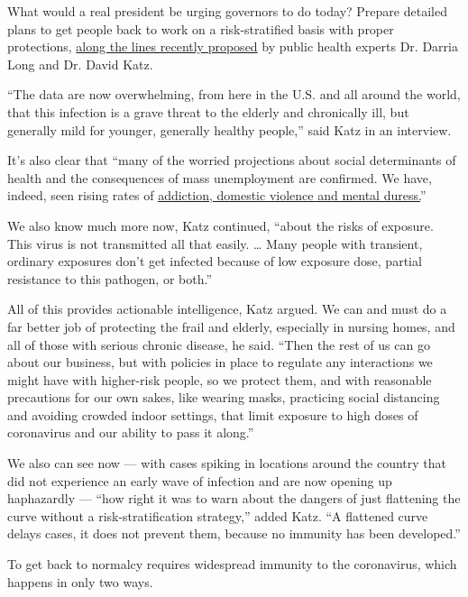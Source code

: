 What would a real president be urging governors to do today? Prepare
detailed plans to get people back to work on a risk-stratified basis
with proper protections,
\href{https://medium.com/@drdarrialonganddrdavidkatz/as-cities-move-toward-reopening-how-to-manage-risks-1834a264f9d1}{along
the lines recently proposed} by public health experts Dr. Darria Long
and Dr. David Katz.

``The data are now overwhelming, from here in the U.S. and all around
the world, that this infection is a grave threat to the elderly and
chronically ill, but generally mild for younger, generally healthy
people,'' said Katz in an interview.

It's also clear that ``many of the worried projections about social
determinants of health and the consequences of mass unemployment are
confirmed. We have, indeed, seen rising rates of
\href{https://www.mlive.com/public-interest/2020/05/michigans-coronavirus-crisis-creates-epidemic-of-mental-health-issues.html}{addiction,
domestic violence and mental duress.}''

We also know much more now, Katz continued, ``about the risks of
exposure. This virus is not transmitted all that easily. \ldots{} Many
people with transient, ordinary exposures don't get infected because of
low exposure dose, partial resistance to this pathogen, or both.''

All of this provides actionable intelligence, Katz argued. We can and
must do a far better job of protecting the frail and elderly, especially
in nursing homes, and all of those with serious chronic disease, he
said. ``Then the rest of us can go about our business, but with policies
in place to regulate any interactions we might have with higher-risk
people, so we protect them, and with reasonable precautions for our own
sakes, like wearing masks, practicing social distancing and avoiding
crowded indoor settings, that limit exposure to high doses of
coronavirus and our ability to pass it along.''

We also can see now --- with cases spiking in locations around the
country that did not experience an early wave of infection and are now
opening up haphazardly --- ``how right it was to warn about the dangers
of just flattening the curve without a risk-stratification strategy,''
added Katz. ``A flattened curve delays cases, it does not prevent them,
because no immunity has been developed.''

To get back to normalcy requires widespread immunity to the coronavirus,
which happens in only two ways.

